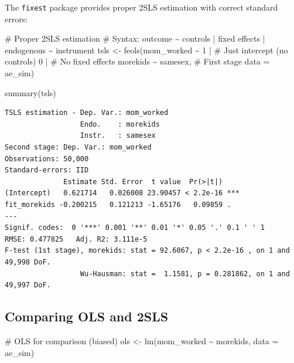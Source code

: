 \documentclass[
  letterpaper,
  DIV=11,
  numbers=noendperiod]{scrreprt}
\newenvironment{Shaded}{\begin{snugshade}}{\end{snugshade}}
\newcommand{\AttributeTok}[1]{\textcolor[rgb]{0.40,0.45,0.13}{#1}}
\newcommand{\CommentTok}[1]{\textcolor[rgb]{0.37,0.37,0.37}{#1}}
\newcommand{\DecValTok}[1]{\textcolor[rgb]{0.68,0.00,0.00}{#1}}
\newcommand{\FunctionTok}[1]{\textcolor[rgb]{0.28,0.35,0.67}{#1}}
\newcommand{\NormalTok}[1]{\textcolor[rgb]{0.00,0.23,0.31}{#1}}
\newcommand{\OtherTok}[1]{\textcolor[rgb]{0.00,0.23,0.31}{#1}}
\newcommand{\SpecialCharTok}[1]{\textcolor[rgb]{0.37,0.37,0.37}{#1}}
\begin{document}
The \texttt{fixest} package provides proper 2SLS estimation with correct
standard errors:

\begin{Shaded}
\begin{Highlighting}[]
\CommentTok{\# Proper 2SLS estimation}
\CommentTok{\# Syntax: outcome \textasciitilde{} controls | fixed effects | endogenous \textasciitilde{} instrument}
\NormalTok{tsls }\OtherTok{\textless{}{-}} \FunctionTok{feols}\NormalTok{(mom\_worked }\SpecialCharTok{\textasciitilde{}} \DecValTok{1} \SpecialCharTok{|}  \CommentTok{\# Just intercept (no controls)}
                           \DecValTok{0} \SpecialCharTok{|}  \CommentTok{\# No fixed effects}
\NormalTok{                           morekids }\SpecialCharTok{\textasciitilde{}}\NormalTok{ samesex,  }\CommentTok{\# First stage}
              \AttributeTok{data =}\NormalTok{ ae\_sim)}

\FunctionTok{summary}\NormalTok{(tsls)}
\end{Highlighting}
\end{Shaded}

\begin{verbatim}
TSLS estimation - Dep. Var.: mom_worked
                  Endo.    : morekids
                  Instr.   : samesex
Second stage: Dep. Var.: mom_worked
Observations: 50,000
Standard-errors: IID 
              Estimate Std. Error  t value  Pr(>|t|)    
(Intercept)   0.621714   0.026008 23.90457 < 2.2e-16 ***
fit_morekids -0.200215   0.121213 -1.65176   0.09859 .  
---
Signif. codes:  0 '***' 0.001 '**' 0.01 '*' 0.05 '.' 0.1 ' ' 1
RMSE: 0.477825   Adj. R2: 3.111e-5
F-test (1st stage), morekids: stat = 92.6067, p < 2.2e-16 , on 1 and 49,998 DoF.
                  Wu-Hausman: stat =  1.1581, p = 0.281862, on 1 and 49,997 DoF.
\end{verbatim}

\subsection{Comparing OLS and 2SLS}\label{comparing-ols-and-2sls}

\begin{Shaded}
\begin{Highlighting}[]
\CommentTok{\# OLS for comparison (biased)}
\NormalTok{ols }\OtherTok{\textless{}{-}} \FunctionTok{lm}\NormalTok{(mom\_worked }\SpecialCharTok{\textasciitilde{}}\NormalTok{ morekids, }\AttributeTok{data =}\NormalTok{ ae\_sim)}
\end{Highlighting}
\end{Shaded}
\end{document}
